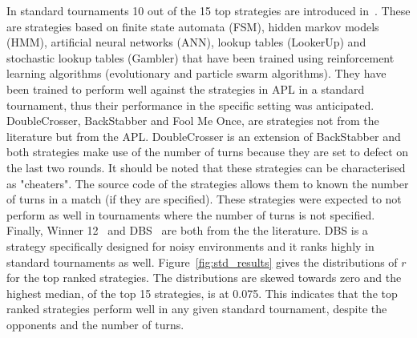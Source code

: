 \documentclass{article}
\begin{document}
In standard tournaments 10 out of the 15 top strategies are introduced
in~\cite{Harper2017}. These are strategies based on finite state automata (FSM),
hidden markov models (HMM), artificial neural networks (ANN), lookup tables
(LookerUp) and stochastic lookup tables (Gambler) that have been trained using
reinforcement learning algorithms (evolutionary and particle swarm algorithms).
They have been trained to perform well against the strategies
in APL in a standard tournament, thus their performance in the
specific setting was anticipated. DoubleCrosser, BackStabber and Fool Me Once, are
strategies not from the literature but from the APL. DoubleCrosser is an extension
of BackStabber and both strategies make use of the number of turns because they are
set to defect on the last two rounds. It should be noted that these
strategies can be characterised as "cheaters". The source code of the strategies
allows them to known the number of turns in a match (if they are specified).
These strategies were expected to not perform as well in
tournaments where the number of turns is not specified. Finally, Winner
12~\cite{mathieu2017} and DBS~\cite{Au2006} are both from the the literature.
DBS is a strategy specifically designed for noisy environments and it ranks
highly in standard tournaments as well.
Figure~\ref{fig:std_results} gives the distributions of $r$ for the top
ranked strategies. The distributions are skewed towards zero and the highest
median, of the top 15 strategies, is at 0.075. This indicates that the top ranked
strategies perform well in any given standard tournament, despite the opponents and
the number of turns.
\end{document}

